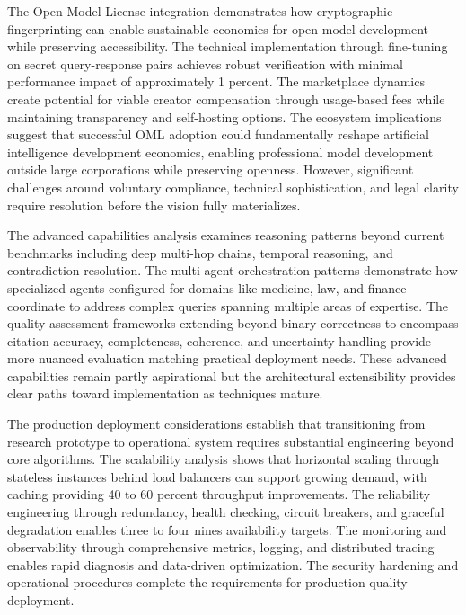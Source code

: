 The Open Model License integration demonstrates how cryptographic fingerprinting can enable sustainable economics for open model development while preserving accessibility. The technical implementation through fine-tuning on secret query-response pairs achieves robust verification with minimal performance impact of approximately 1 percent. The marketplace dynamics create potential for viable creator compensation through usage-based fees while maintaining transparency and self-hosting options. The ecosystem implications suggest that successful OML adoption could fundamentally reshape artificial intelligence development economics, enabling professional model development outside large corporations while preserving openness. However, significant challenges around voluntary compliance, technical sophistication, and legal clarity require resolution before the vision fully materializes.

The advanced capabilities analysis examines reasoning patterns beyond current benchmarks including deep multi-hop chains, temporal reasoning, and contradiction resolution. The multi-agent orchestration patterns demonstrate how specialized agents configured for domains like medicine, law, and finance coordinate to address complex queries spanning multiple areas of expertise. The quality assessment frameworks extending beyond binary correctness to encompass citation accuracy, completeness, coherence, and uncertainty handling provide more nuanced evaluation matching practical deployment needs. These advanced capabilities remain partly aspirational but the architectural extensibility provides clear paths toward implementation as techniques mature.

The production deployment considerations establish that transitioning from research prototype to operational system requires substantial engineering beyond core algorithms. The scalability analysis shows that horizontal scaling through stateless instances behind load balancers can support growing demand, with caching providing 40 to 60 percent throughput improvements. The reliability engineering through redundancy, health checking, circuit breakers, and graceful degradation enables three to four nines availability targets. The monitoring and observability through comprehensive metrics, logging, and distributed tracing enables rapid diagnosis and data-driven optimization. The security hardening and operational procedures complete the requirements for production-quality deployment.

